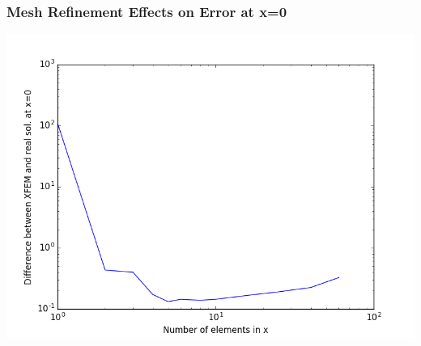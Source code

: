 \documentclass[]{beamer}
\begin{document}
\begin{frame}[t]\frametitle{Mesh Refinement Effects on Error at x=0}
	\begin{center}
		\includegraphics[scale=0.4]{figures/1D_xy_homog1mat_neumann_comp}
	\end{center}
\end{frame}
\end{document}
